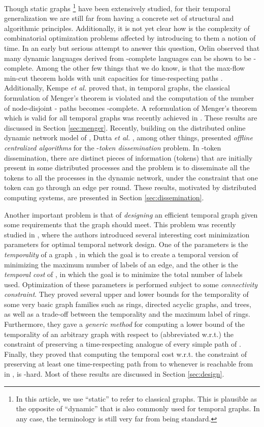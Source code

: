 \documentclass[oribibl, 11pt]{llncs}
\begin{document}
Though static graphs \footnote{In this article, we use ``static'' to refer to classical graphs. This is plausible as the opposite of ``dynamic'' that is also commonly used for temporal graphs. In any case, the terminology is still very far from being standard.} have been extensively studied, for their temporal generalization we are still far from having a concrete set of structural and algorithmic principles. Additionally, it is not yet clear how is the complexity of combinatorial optimization problems affected by introducing to them a notion of time. In an early but serious attempt to answer this question, Orlin \cite{Or81} observed that many dynamic languages derived from -complete languages can be shown to be -complete. Among the other few things that we do know, is that the max-flow min-cut theorem holds with unit capacities for time-respecting paths \cite{Be96}. Additionally, Kempe \emph{et al.} \cite{KKK00} proved that, in temporal graphs, the classical formulation of Menger's theorem is violated and the computation of the number of node-disjoint - paths becomes -complete. A reformulation of Menger's theorem which is valid for all temporal graphs was recently achieved in \cite{MMCS13}. These results are discussed in Section \ref{sec:menger}. Recently, building on the distributed online dynamic network model of \cite{KLO10}, Dutta \emph{et al.} \cite{DPRS13}, among other things, presented \emph{offline centralized algorithms} for the -\emph{token dissemination} problem. In -token dissemination, there are  distinct pieces of information (tokens) that are initially present in some distributed processes and the problem is to disseminate all the  tokens to all the processes in the dynamic network, under the constraint that one token can go through an edge per round. These results, motivated by distributed computing systems, are presented in Section \ref{sec:dissemination}.

Another important problem is that of \emph{designing} an efficient temporal graph given some requirements that the graph should meet. This problem was recently studied in \cite{MMCS13}, where the authors introduced several interesting cost minimization parameters for optimal temporal network design. One of the parameters is the \emph{temporality} of a graph , in which the goal is to create a temporal version of  minimizing the maximum number of labels of an edge, and the other is the \emph{temporal cost} of , in which the goal is to minimize the total number of labels used. Optimization of these parameters is performed subject to some \emph{connectivity constraint}. They proved several upper and lower bounds for the temporality of some very basic graph families such as rings, directed acyclic graphs, and trees, as well as a trade-off between the temporality and the maximum label of rings. Furthermore, they gave a \emph{generic method} for computing a lower bound of the temporality of an arbitrary graph with respect to (abbreviated w.r.t.) the constraint of preserving a time-respecting analogue of every simple path of . Finally, they proved that computing the temporal cost w.r.t. the constraint of preserving at least one time-respecting path from  to  whenever  is reachable from  in , is -hard. Most of these results are discussed in Section \ref{sec:design}.
\end{document}
